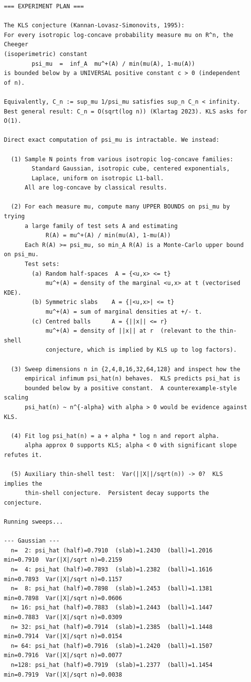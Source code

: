 \documentclass[11pt]{article}
\begin{document}
\begin{lstlisting}
=== EXPERIMENT PLAN ===

The KLS conjecture (Kannan-Lovasz-Simonovits, 1995):
For every isotropic log-concave probability measure mu on R^n, the Cheeger
(isoperimetric) constant
        psi_mu  =  inf_A  mu^+(A) / min(mu(A), 1-mu(A))
is bounded below by a UNIVERSAL positive constant c > 0 (independent of n).

Equivalently, C_n := sup_mu 1/psi_mu satisfies sup_n C_n < infinity.
Best general result: C_n = O(sqrt(log n)) (Klartag 2023). KLS asks for O(1).

Direct exact computation of psi_mu is intractable. We instead:

  (1) Sample N points from various isotropic log-concave families:
        Standard Gaussian, isotropic cube, centered exponentials,
        Laplace, uniform on isotropic L1-ball.
      All are log-concave by classical results.

  (2) For each measure mu, compute many UPPER BOUNDS on psi_mu by trying
      a large family of test sets A and estimating
            R(A) = mu^+(A) / min(mu(A), 1-mu(A))
      Each R(A) >= psi_mu, so min_A R(A) is a Monte-Carlo upper bound on psi_mu.
      Test sets:
        (a) Random half-spaces  A = {<u,x> <= t}
            mu^+(A) = density of the marginal <u,x> at t (vectorised KDE).
        (b) Symmetric slabs    A = {|<u,x>| <= t}
            mu^+(A) = sum of marginal densities at +/- t.
        (c) Centred balls      A = {||x|| <= r}
            mu^+(A) = density of ||x|| at r  (relevant to the thin-shell
            conjecture, which is implied by KLS up to log factors).

  (3) Sweep dimensions n in {2,4,8,16,32,64,128} and inspect how the
      empirical infimum psi_hat(n) behaves.  KLS predicts psi_hat is
      bounded below by a positive constant.  A counterexample-style scaling
      psi_hat(n) ~ n^{-alpha} with alpha > 0 would be evidence against KLS.

  (4) Fit log psi_hat(n) = a + alpha * log n and report alpha.
      alpha approx 0 supports KLS; alpha < 0 with significant slope refutes it.

  (5) Auxiliary thin-shell test:  Var(||X||/sqrt(n)) -> 0?  KLS implies the
      thin-shell conjecture.  Persistent decay supports the conjecture.

Running sweeps...

--- Gaussian ---
  n=  2: psi_hat (half)=0.7910  (slab)=1.2430  (ball)=1.2016  min=0.7910  Var(|X|/sqrt n)=0.2159
  n=  4: psi_hat (half)=0.7893  (slab)=1.2382  (ball)=1.1616  min=0.7893  Var(|X|/sqrt n)=0.1157
  n=  8: psi_hat (half)=0.7898  (slab)=1.2453  (ball)=1.1381  min=0.7898  Var(|X|/sqrt n)=0.0606
  n= 16: psi_hat (half)=0.7883  (slab)=1.2443  (ball)=1.1447  min=0.7883  Var(|X|/sqrt n)=0.0309
  n= 32: psi_hat (half)=0.7914  (slab)=1.2385  (ball)=1.1448  min=0.7914  Var(|X|/sqrt n)=0.0154
  n= 64: psi_hat (half)=0.7916  (slab)=1.2420  (ball)=1.1507  min=0.7916  Var(|X|/sqrt n)=0.0077
  n=128: psi_hat (half)=0.7919  (slab)=1.2377  (ball)=1.1454  min=0.7919  Var(|X|/sqrt n)=0.0038


\end{lstlisting}
\end{document}
